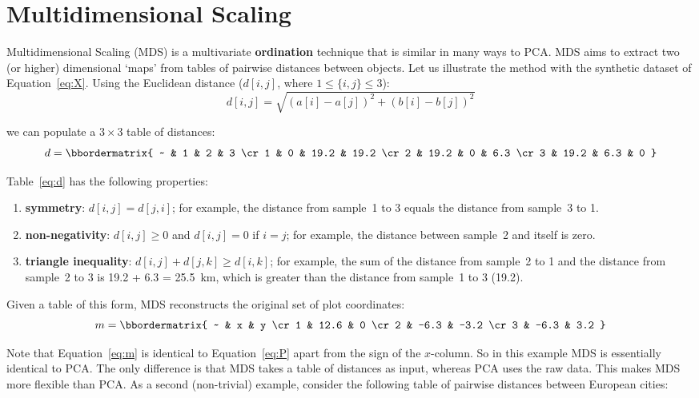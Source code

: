 \section{Multidimensional Scaling}
\label{sec:MDS}

Multidimensional Scaling (MDS) is a multivariate \textbf{ordination}
technique that is similar in many ways to PCA. MDS aims to extract two
(or higher) dimensional `maps' from tables of pairwise distances
between objects. Let us illustrate the method with the synthetic
dataset of Equation~\ref{eq:X}. Using the Euclidean distance
($d[i,j]$, where $1\leq\{i,j\}\leq{3}$):
\begin{equation}
  d[i,j] = \sqrt{(a[i]-a[j])^2 + (b[i]-b[j])^2}
  \label{eq:euclidean}
\end{equation}

\noindent we can populate a ${3}\times{3}$ table of distances:
\begin{equation}
  d = \bbordermatrix{
    ~ & 1    & 2    & 3 \cr
    1 & 0    & 19.2 & 19.2 \cr
    2 & 19.2 & 0    & 6.3 \cr
    3 & 19.2 & 6.3  & 0
  }
  \label{eq:d}
\end{equation}

Table~\ref{eq:d} has the following properties:

\begin{enumerate}
\item{\bf symmetry}: $d[i,j]=d[j,i]$; for example, the distance from
  sample~1 to 3 equals the distance from sample~3 to 1.
\item{\bf non-negativity}: $d[i,j]\geq{0}$ and $d[i,j]=0$ if $i=j$;
  for example, the distance between sample~2 and itself is zero.
\item{\bf triangle inequality}: $d[i,j]+d[j,k]\geq{d[i,k]}$; for
  example, the sum of the distance from sample~2 to 1 and the distance
  from sample~2 to 3 is 19.2 + 6.3 = 25.5~km, which is greater than
  the distance from sample~1 to 3 (19.2).
\end{enumerate}

Given a table of this form, MDS reconstructs the original set of plot
coordinates:
\begin{equation}
  m = \bbordermatrix{
    ~ & x    & y \cr
    1 & 12.6 &  0 \cr
    2 & -6.3 & -3.2 \cr
    3 & -6.3 &  3.2 
  }
  \label{eq:m}
\end{equation}

Note that Equation~\ref{eq:m} is identical to Equation~\ref{eq:P}
apart from the sign of the $x$-column.  So in this example MDS is
essentially identical to PCA. The only difference is that MDS takes a
table of distances as input, whereas PCA uses the raw data. This makes
MDS more flexible than PCA. As a second (non-trivial) example,
consider the following table of pairwise distances between European
cities:

